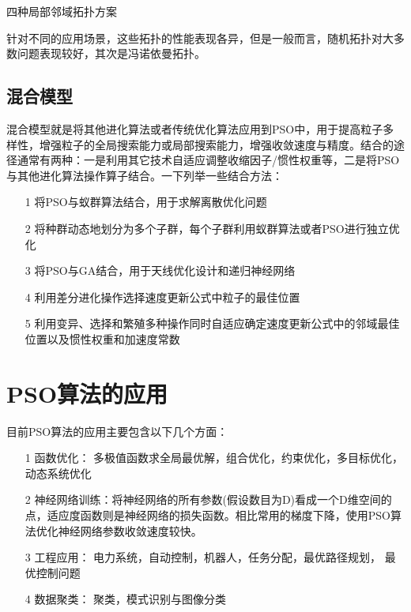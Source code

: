 \documentclass[8pt]{article}
\begin{document}
\centerline{四种局部邻域拓扑方案}
针对不同的应用场景，这些拓扑的性能表现各异，但是一般而言，随机拓扑对大多数问题表现较好，其次是冯诺依曼拓扑。

\subsection{混合模型}
混合模型就是将其他进化算法或者传统优化算法应用到PSO中，用于提高粒子多样性，增强粒子的全局搜索能力或局部搜索能力，增强收敛速度与精度。结合的途径通常有两种：一是利用其它技术自适应调整收缩因子/惯性权重等，二是将PSO与其他进化算法操作算子结合。一下列举一些结合方法：
\begin{itemize}[leftmargin=2em]
	\setlength{\itemsep}{0pt}
	\setlength{\parsep}{0pt}
	\setlength{\parskip}{0pt}
	\item[1] 将PSO与蚁群算法结合，用于求解离散优化问题
	\item[2] 将种群动态地划分为多个子群，每个子群利用蚁群算法或者PSO进行独立优化
	\item[3] 将PSO与GA结合，用于天线优化设计和递归神经网络
	\item[4] 利用差分进化操作选择速度更新公式中粒子的最佳位置
	\item[5] 利用变异、选择和繁殖多种操作同时自适应确定速度更新公式中的邻域最佳位置以及惯性权重和加速度常数
\end{itemize}

\section{PSO算法的应用}
目前PSO算法的应用主要包含以下几个方面：
\begin{itemize}[leftmargin=2em]
	\setlength{\itemsep}{0pt}
	\setlength{\parsep}{0pt}
	\setlength{\parskip}{0pt}
	\item[1] 函数优化： 多极值函数求全局最优解，组合优化，约束优化，多目标优化，动态系统优化
	\item[2] 神经网络训练：将神经网络的所有参数(假设数目为D)看成一个D维空间的点，适应度函数则是神经网络的损失函数。相比常用的梯度下降，使用PSO算法优化神经网络参数收敛速度较快。
	\item[3] 工程应用： 电力系统，自动控制，机器人，任务分配，最优路径规划， 最优控制问题
	\item[4] 数据聚类： 聚类，模式识别与图像分类
\end{itemize}



\end{document}
